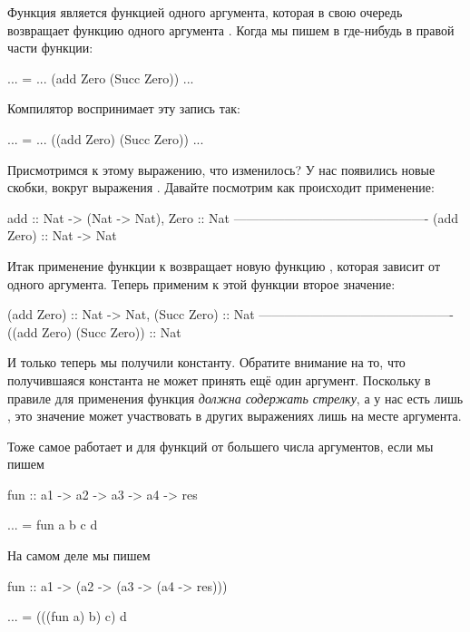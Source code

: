 Функция  является функцией одного 
аргумента, которая в свою очередь возвращает функцию
одного аргумента . Когда мы пишем в 
где-нибудь в правой части функции:

\begin{code}
... =  ... (add Zero (Succ Zero)) ...
\end{code}

Компилятор воспринимает эту запись так:


\begin{code}
... =  ... ((add Zero) (Succ Zero)) ...
\end{code}

Присмотримся к этому выражению, что изменилось? У нас
появились новые скобки, вокруг выражения .
Давайте посмотрим как происходит применение:

\begin{code}
              add :: Nat -> (Nat -> Nat),       Zero :: Nat
              ----------------------------------------------
                        (add Zero) :: Nat -> Nat
\end{code}

Итак применение функции  к  возвращает
новую функцию \mbox{}, которая зависит от одного аргумента.
Теперь применим к этой функции второе значение:

\begin{code}
              (add Zero) :: Nat -> Nat,   (Succ Zero) :: Nat
              ----------------------------------------------
                     ((add Zero) (Succ Zero)) :: Nat
\end{code}

И только теперь мы получили константу. Обратите внимание
на то, что получившаяся константа не может принять ещё один аргумент.
Поскольку в правиле для применения функция  \emph{должна содержать
стрелку}, а у нас есть лишь , это значение может участвовать
в других выражениях лишь на месте аргумента. 

Тоже самое работает и для функций от большего числа аргументов,
если мы пишем

\begin{code}
fun :: a1 -> a2 -> a3 -> a4 -> res

... = fun a b c d
\end{code}

На самом деле мы пишем
\begin{code}
fun :: a1 -> (a2 -> (a3 -> (a4 -> res)))

... = (((fun a) b) c) d
\end{code}

